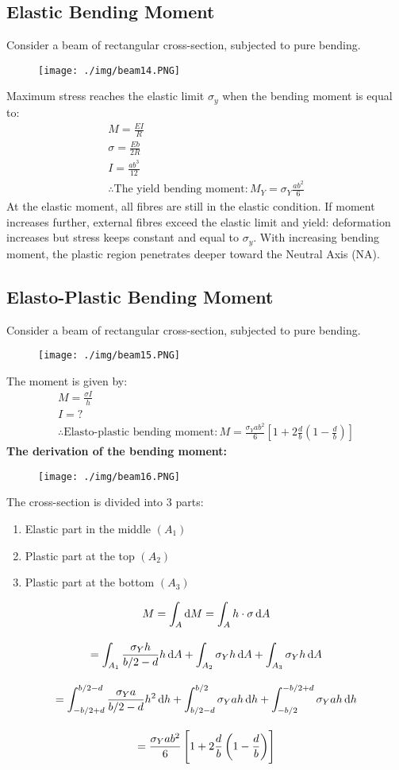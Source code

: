 \subsection{Elastic Bending Moment}
Consider a beam of rectangular cross-section, subjected to pure bending.
\begin{figure}[H]
  \centering
  \texttt{[image: ./img/beam14.PNG]}
\end{figure}
Maximum stress reaches the elastic limit $\sigma_y$ when the bending moment is equal to:
\begin{gather}
  M = \frac{EI}{R} \\
  \sigma = \frac{Eb}{2R} \\
  I = \frac{ab^3}{12} \\
  \therefore \text{The yield bending moment}: M_Y = \sigma_Y\frac{ab^2}{6}
\end{gather}
At the elastic moment, all fibres are still in the elastic condition.
If moment increases further, external fibres exceed the elastic limit and yield: deformation increases but stress keeps constant and equal to $\sigma_y$.
With increasing bending moment, the plastic region penetrates deeper toward the Neutral Axis (NA).
\subsection{Elasto-Plastic Bending Moment}
Consider a beam of rectangular cross-section, subjected to pure bending.
\begin{figure}[H]
  \centering
  \texttt{[image: ./img/beam15.PNG]}
\end{figure}
The moment is given by:
\begin{gather}
  M = \frac{\sigma I}{h} \\
  I = ? \\
  \therefore \text{Elasto-plastic bending moment}: M = \frac{\sigma_Y ab^2}{6}\left[1+2\frac{d}{b}\left(1-\frac{d}{b}\right)\right]
\end{gather}
\textbf{The derivation of the bending moment:}
\begin{figure}[H]
  \centering
  \texttt{[image: ./img/beam16.PNG]}
\end{figure}
The cross-section is divided into 3 parts:
\begin{enumerate}
  \item Elastic part in the middle $(A_1)$
  \item Plastic part at the top $(A_2)$
  \item Plastic part at the bottom $(A_3)$
\end{enumerate}
\begin{gather}
  M = \int_{A}\dif M = \int_{A}h\cdot \sigma \dif A \\[10pt]
  = \int_{A_1}\frac{\sigma_Y h}{b/2-d}h\dif A + \int_{A_2}\sigma_Y h\dif A + \int_{A_3}\sigma_Y h\dif A \\[10pt]
  = \int_{-b/2+d}^{b/2-d}\frac{\sigma_Y a}{b/2-d}h^2\dif h + \int_{b/2-d}^{b/2}\sigma_Y ah\dif h + \int_{-b/2}^{-b/2+d}\sigma_Y ah\dif h \\[10pt]
  = \frac{\sigma_Y ab^2}{6}\left[1+2\frac{d}{b}\left(1-\frac{d}{b}\right)\right]
\end{gather}
